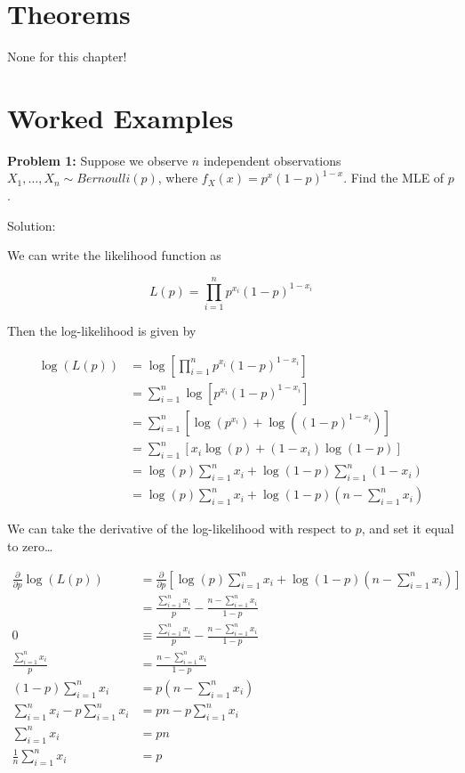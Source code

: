 \documentclass[
  letterpaper,
  DIV=11,
  numbers=noendperiod]{scrreprt}
\begin{document}
\section{Theorems}\label{theorems-1}

None for this chapter!

\section{Worked Examples}\label{worked-examples-1}

\textbf{Problem 1:} Suppose we observe \(n\) independent observations
\(X_1, \dots, X_n \sim Bernoulli(p)\), where
\(f_X(x) = p^x(1-p)^{1-x}\). Find the MLE of \(p\).

Solution:

We can write the likelihood function as

\[
L(p) = \prod_{i = 1}^n p^{x_i} (1-p)^{1 - x_i} 
\]

Then the log-likelihood is given by

\begin{align*} 
\log(L(p)) & = \log \left[ \prod_{i = 1}^n p^{x_i} (1-p)^{1 - x_i} \right] \\ 
& = \sum_{i = 1}^n \log \left[p^{x_i} (1-p)^{1 - x_i} \right] \\
& = \sum_{i = 1}^n \left[ \log(p^{x_i}) + \log((1-p)^{1-x_i}) \right] \\
& = \sum_{i = 1}^n \left[ x_i \log(p) + (1 - x_i) \log(1-p) \right] \\
& = \log(p)\sum_{i = 1}^n x_i  + \log(1-p) \sum_{i = 1}^n (1 - x_i)  \\
& = \log(p)\sum_{i = 1}^n x_i  + \log(1-p)  (n - \sum_{i = 1}^n x_i)
\end{align*}

We can take the derivative of the log-likelihood with respect to \(p\),
and set it equal to zero\ldots{}

\begin{align*} 
\frac{\partial}{\partial p} \log(L(p)) & = \frac{\partial}{\partial p} \left[ \log(p)\sum_{i = 1}^n x_i  + \log(1-p)  (n - \sum_{i = 1}^n x_i) \right] \\
& = \frac{\sum_{i = 1}^n x_i }{p} - \frac{n - \sum_{i = 1}^n x_i}{1-p} \\
0 & \equiv \frac{\sum_{i = 1}^n x_i }{p} - \frac{n - \sum_{i = 1}^n x_i}{1-p} \\
\frac{\sum_{i = 1}^n x_i }{p}  & = \frac{n - \sum_{i = 1}^n x_i}{1-p} \\
(1-p) \sum_{i = 1}^n x_i & = p (n - \sum_{i = 1}^n x_i) \\
\sum_{i = 1}^n x_i - p\sum_{i = 1}^n x_i & = pn - p \sum_{i = 1}^n x_i \\
\sum_{i = 1}^n x_i & = pn \\
\frac{1}{n} \sum_{i = 1}^n x_i & = p
\end{align*}
\end{document}
